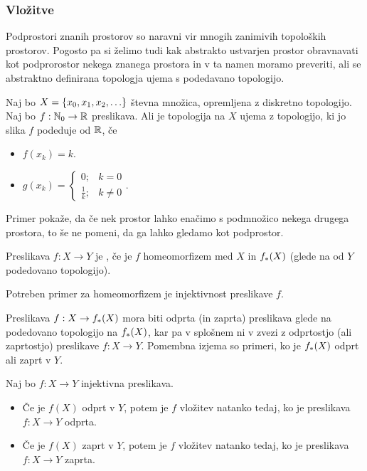 \subsubsection{Vložitve}
Podprostori znanih prostorov so naravni vir mnogih zanimivih topoloških prostorov. Pogosto pa si želimo tudi kak abstrakto ustvarjen prostor obravnavati kot podprorostor nekega znanega prostora in v ta namen moramo preveriti, ali se abstraktno definirana topologja ujema s podedavano topologijo.

\begin{primer}
    Naj bo $X = \left\{x_0, x_1, x_2, \ldots\right\}$ števna množica, opremljena z diskretno topologijo. Naj bo $f: \mathbb{N}_0 \to \mathbb{R}$ preslikava. Ali je topologija na $X$ ujema z topologijo, ki jo slika $f$ podeduje od $\mathbb{R}$, če
    \begin{itemize}
        \item $f(x_k) = k$.
        \item $g(x_k) = \begin{cases}
            0; &k = 0 \\ \frac{1}{k}; & k \neq 0
        \end{cases}.$
    \end{itemize}
\end{primer}

\begin{opomba}
    Primer pokaže, da če nek prostor lahko enačimo s podmnožico nekega drugega prostora, to še ne pomeni, da ga lahko gledamo kot podprostor.
\end{opomba}

\begin{definicija}
    Preslikava $f: X \to Y$ je , če je $f$ homeomorfizem med $X$ in $f_{*}(X)$ (glede na od $Y$ podedovano topologijo).
\end{definicija}

\begin{opomba}
    Potreben primer za homeomorfizem je injektivnost preslikave $f$. 
\end{opomba}

Preslikava $f: X \to f_{*}(X)$ mora biti odprta (in zaprta) preslikava glede na podedovano topologijo na $f_{*}(X)$, kar pa v splošnem ni v zvezi z odprtostjo (ali zaprtostjo) preslikave $f: X \to Y$. Pomembna izjema so primeri, ko je $f_{*}(X)$ odprt ali zaprt v $Y$.

\begin{trditev}
    Naj bo $f: X \to Y$ injektivna preslikava.
    \begin{itemize}
        \item Če je $f(X)$ odprt v $Y$, potem je $f$ vložitev natanko tedaj, ko je preslikava $f: X \to Y$ odprta.
        \item Če je $f(X)$ zaprt v $Y$, potem je $f$ vložitev natanko tedaj, ko je preslikava $f: X \to Y$ zaprta.
    \end{itemize}
\end{trditev}

